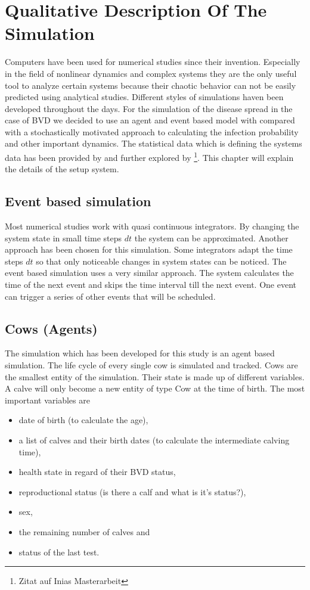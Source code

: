 \chapter{Qualitative Description Of The Simulation}
Computers have been used for numerical studies since their invention. Especially in the field of nonlinear dynamics and complex systems they are the only useful tool to analyze certain systems because their chaotic behavior can not be easily predicted using analytical studies. Different styles of simulations haven been developed throughout the days. For the simulation of the disease spread in the case of BVD we decided to use an agent and event based model with compared with a stochastically motivated approach to calculating the infection probability and other important dynamics. The statistical data which is defining the systems data has been provided by \citep{personalCom} and further explored by \footnote{Zitat auf Inias Masterarbeit}. This chapter will explain the details of the setup system.
\section{Event based simulation}
Most numerical studies work with quasi continuous integrators. By changing the system state in small time steps $dt$ the system can be approximated. Another approach has been chosen for this simulation. Some integrators adapt the time steps $dt$ so that only noticeable changes in system states can be noticed. The event based simulation uses a very similar approach. The system calculates the time of the next event and skips the time interval till the next event. One event can trigger a series of other events that will be scheduled. 
\section{Cows (Agents)}
The simulation which has been developed for this study is an agent based simulation. The life cycle of every single cow is simulated and tracked. Cows are the smallest entity of the simulation. Their state is made up of different variables. A calve will only become a new entity of type Cow at the time of birth. The most important variables are 
\begin{itemize}
\item date of birth (to calculate the age),
\item a list of calves and their birth dates (to calculate the intermediate calving time),
\item health state in regard of their BVD status,
\item reproductional status (is there a calf and what is it's status?),
\item sex,
\item the remaining number of calves and
\item status of the last test.
\end{itemize}

